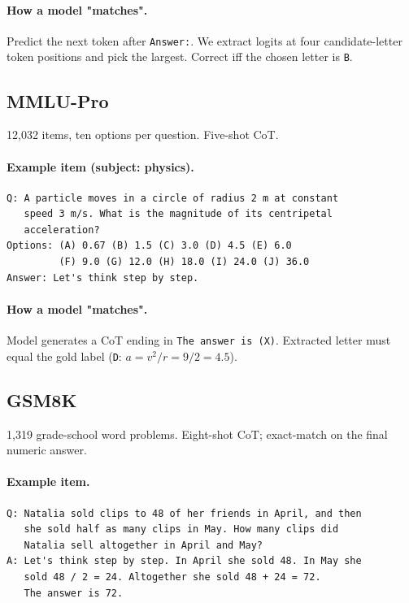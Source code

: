 \paragraph{How a model "matches".} Predict the next token after
\verb|Answer:|. We extract logits at four candidate-letter token
positions and pick the largest. Correct iff the chosen letter is
\verb|B|.

\subsection{MMLU-Pro}
\label{app:ex-mmlu-pro}

12{,}032 items, ten options per question. Five-shot CoT.

\paragraph{Example item (subject: physics).}
\begin{verbatim}
Q: A particle moves in a circle of radius 2 m at constant
   speed 3 m/s. What is the magnitude of its centripetal
   acceleration?
Options: (A) 0.67 (B) 1.5 (C) 3.0 (D) 4.5 (E) 6.0
         (F) 9.0 (G) 12.0 (H) 18.0 (I) 24.0 (J) 36.0
Answer: Let's think step by step.
\end{verbatim}

\paragraph{How a model "matches".} Model generates a CoT ending in
\verb|The answer is (X)|. Extracted letter must equal the gold
label (\verb|D|: $a=v^2/r=9/2=4.5$).

\subsection{GSM8K}
\label{app:ex-gsm8k}

1{,}319 grade-school word problems. Eight-shot CoT; exact-match on
the final numeric answer.

\paragraph{Example item.}
\begin{verbatim}
Q: Natalia sold clips to 48 of her friends in April, and then
   she sold half as many clips in May. How many clips did
   Natalia sell altogether in April and May?
A: Let's think step by step. In April she sold 48. In May she
   sold 48 / 2 = 24. Altogether she sold 48 + 24 = 72.
   The answer is 72.
\end{verbatim}

